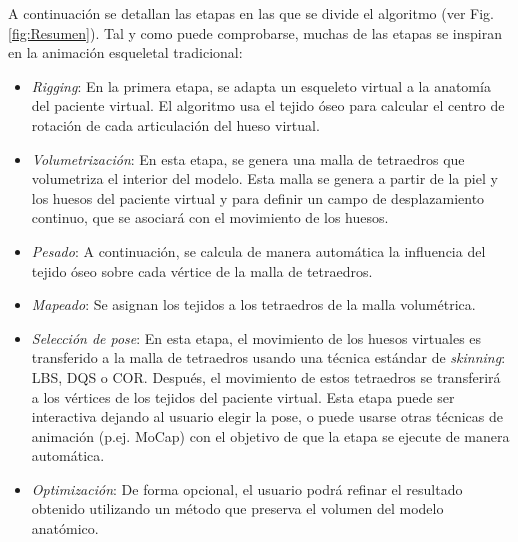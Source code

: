 A continuación\new{,} se detallan las etapas en las que se divide el algoritmo (ver Fig. \ref{fig:Resumen}). Tal y como puede comprobarse, muchas de las etapas\del{,} se inspiran en la animación esqueletal tradicional:
\begin{itemize}

	\item \emph{Rigging}: %
	En la primera etapa, se adapta un esqueleto virtual a la anatomía del paciente virtual. El algoritmo usa el tejido óseo para calcular el centro de rotación de cada articulación del hueso virtual.
	
     \item \emph{Volumetrización}: En esta etapa, se genera una malla de tetraedros que volumetriza el interior del modelo. Esta malla se genera a partir de la  piel y los huesos del paciente virtual y   para definir un campo de desplazamiento continuo, que se asociará con el movimiento de los huesos.

    \item \emph{Pesado}: A continuación, se calcula de manera automática la influencia del tejido óseo sobre cada vértice de la malla de tetraedros. 
    
    \item \emph{Mapeado}: Se asignan los tejidos a los tetraedros de la malla volumétrica. 

    \item \emph{Selección de pose}: En esta etapa, el movimiento de los huesos virtuales es transferido a la malla de tetraedros\new{,} usando una técnica estándar de \emph{skinning}: \ac{LBS}, \ac{DQS} o \ac{COR}. 
    Después, el movimiento de estos tetraedros se transferirá a los vértices de los tejidos del paciente virtual.
    Esta etapa puede ser interactiva dejando al usuario elegir la pose, o puede usarse otras técnicas de animación (p.ej. \ac{MoCap}) con el objetivo de que la etapa se ejecute de manera automática.%
    \item \emph{Optimización}: De forma opcional, el usuario podrá refinar el resultado obtenido utilizando un método que preserva el volumen del modelo anatómico.
\end{itemize}

